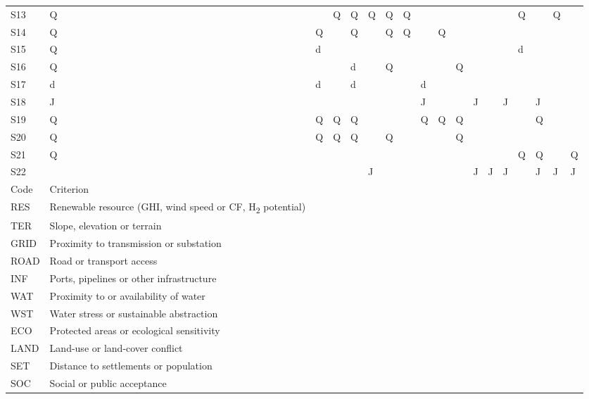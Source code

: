 \documentclass[11pt,a4paper]{article}
\begin{document}
\begin{landscape}
{\begin{longtable}{l>{\raggedright\arraybackslash}p{2.82cm}llllllllllllllll}
S13 & Q &  & Q & Q & Q & Q & Q &  &  &  &  &  &  & Q &  & Q &  \\
S14 & Q & Q &  & Q &  & Q & Q &  & Q &  &  &  &  &  &  &  &  \\
S15 & Q & d &  &  &  &  &  &  &  &  &  &  &  & d &  &  &  \\
S16 & Q &  &  & d &  & Q &  &  &  & Q &  &  &  &  &  &  &  \\
S17 & d & d &  & d &  &  &  & d &  &  &  &  &  &  &  &  &  \\
S18 & J &  &  &  &  &  &  & J &  &  & J &  & J &  & J &  &  \\
S19 & Q & Q & Q & Q &  &  &  & Q & Q & Q &  &  &  &  & Q &  &  \\
S20 & Q & Q & Q & Q &  & Q &  &  &  & Q &  &  &  &  &  &  &  \\
S21 & Q &  &  &  &  &  &  &  &  &  &  &  &  & Q & Q &  & Q \\
S22 &  &  &  &  & J &  &  &  &  &  & J & J & J &  & J & J & J \\
Code & Criterion &  &  &  &  &  &  &  &  &  &  &  &  &  &  &  &  \\
RES & Renewable resource (GHI, wind speed or CF, H\textsubscript{2} potential) &  &  &  &  &  &  &  &  &  &  &  &  &  &  &  &  \\
TER & Slope, elevation or terrain &  &  &  &  &  &  &  &  &  &  &  &  &  &  &  &  \\
GRID & Proximity to transmission or substation &  &  &  &  &  &  &  &  &  &  &  &  &  &  &  &  \\
ROAD & Road or transport access &  &  &  &  &  &  &  &  &  &  &  &  &  &  &  &  \\
INF & Ports, pipelines or other infrastructure &  &  &  &  &  &  &  &  &  &  &  &  &  &  &  &  \\
WAT & Proximity to or availability of water &  &  &  &  &  &  &  &  &  &  &  &  &  &  &  &  \\
WST & Water stress or sustainable abstraction &  &  &  &  &  &  &  &  &  &  &  &  &  &  &  &  \\
ECO & Protected areas or ecological sensitivity &  &  &  &  &  &  &  &  &  &  &  &  &  &  &  &  \\
LAND & Land-use or land-cover conflict &  &  &  &  &  &  &  &  &  &  &  &  &  &  &  &  \\
SET & Distance to settlements or population &  &  &  &  &  &  &  &  &  &  &  &  &  &  &  &  \\
SOC & Social or public acceptance &  &  &  &  &  &  &  &  &  &  &  &  &  &  &  &  \\

\end{longtable}}
\end{landscape}
\end{document}
